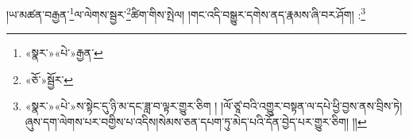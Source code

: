 །ཡ་མཚན་བརྒྱན་\footnote{«སྣར་»«པེ་»རྒྱན་}ལ་ལེགས་སྦྱར་\footnote{«ཅོ་»སྦྱོར་}ཚིག་གིས་སྤེལ། །གང་འདི་བསྒྱུར་དགེས་ནད་རྣམས་ཞི་བར་ཤོག། :\footnote{«སྣར་»«པེ་»ས་སྟེང་དུ་ཉི་མ་དང་ཟླ་བ་ལྟར་གྱུར་ཅིག ། །ལོ་ཙཱ་བའི་འགྱུར་བསྟན་ལ་དཔེ་ཕྱི་བྱས་ནས་བྲིས་ཏེ། ཞུས་དག་ལེགས་པར་བགྱིས་པ་འདིས།སེམས་ཅན་དཔག་ཏུ་མེད་པའི་དོན་བྱེད་པར་གྱུར་ཅིག། །།}